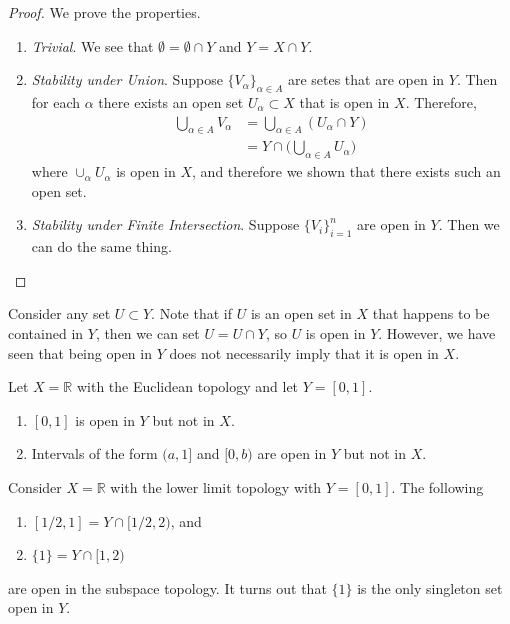   \begin{proof}
    We prove the properties. 
    \begin{enumerate}
      \item \textit{Trivial}. We see that $\emptyset = \emptyset \cap Y$ and $Y = X \cap Y$. 
      \item \textit{Stability under Union}. Suppose $\{V_\alpha\}_{\alpha \in A}$ are setes that are open in $Y$. Then for each $\alpha$ there exists an open set $U_\alpha \subset X$ that is open in $X$. Therefore, 
      \begin{align}
        \bigcup_{\alpha \in A} V_\alpha & = \bigcup_{\alpha \in A} (U_\alpha \cap Y) \\ 
                                        & = Y \cap \bigg( \bigcup_{\alpha \in A} U_\alpha \bigg)
      \end{align}
      where $\cup_\alpha U_\alpha$ is open in $X$, and therefore we shown that there exists such an open set. 

      \item \textit{Stability under Finite Intersection}. Suppose $\{V_i\}_{i = 1}^n$ are open in $Y$. Then we can do the same thing. 
    \end{enumerate}
  \end{proof}

  Consider any set $U \subset Y$. Note that if $U$ is an open set in $X$ that happens to be contained in $Y$, then we can set $U = U \cap Y$, so $U$ is open in $Y$. However, we have seen that being open in $Y$ does not necessarily imply that it is open in $X$. 

  \begin{example}
    Let $X = \mathbb{R}$ with the Euclidean topology and let $Y = [0, 1]$. 
    \begin{enumerate}
      \item $[0, 1]$ is open in $Y$ but not in $X$. 
      \item Intervals of the form $(a, 1]$ and $[0, b)$ are open in $Y$ but not in $X$. 
    \end{enumerate}
  \end{example} 

  \begin{example}
    Consider $X = \mathbb{R}$ with the lower limit topology with $Y = [0, 1]$. The following 
    \begin{enumerate}
      \item $[1/2, 1] = Y \cap [1/2, 2)$, and 
      \item $\{1\} = Y \cap [1, 2)$
    \end{enumerate}
    are open in the subspace topology. It turns out that $\{1\}$ is the only singleton set open in $Y$. 
  \end{example}


